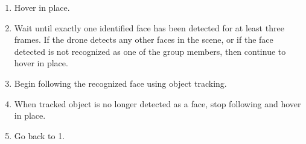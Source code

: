 \documentclass{article}
\begin{document}
\begin{spacing}{1.1}
\begin{enumerate}
\item Hover in place.
\item Wait until exactly one identified face has been detected for at
  least three frames. If the drone detects any other faces in the
  scene, or if the face detected is not recognized as one of the group
  members, then continue to hover in place. 
\item Begin following the recognized face using object tracking. 
\item When tracked object is no longer detected as a face, stop
  following and hover in place.
\item Go back to 1.
\end{enumerate}



\end{spacing}
\end{document}
